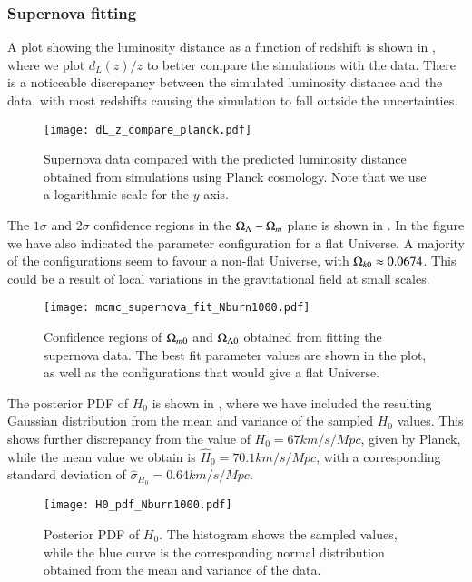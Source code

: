 \subsubsection{Supernova fitting}

A plot showing the luminosity distance as a function of redshift is shown in , where we plot $d_L(z)/z$ to better compare the simulations with the data. There is a noticeable discrepancy between the simulated luminosity distance and the data, with most redshifts causing the simulation to fall outside the uncertainties.       
\begin{figure}[ht!]
    \texttt{[image: dL\_z\_compare\_planck.pdf]}
    \caption{Supernova data compared with the predicted luminosity distance obtained from simulations using Planck cosmology. Note that we use a logarithmic scale for the $y$-axis.}
    \label{fig:M1:dL_of_z_data_vs_Planck}
\end{figure}

The $1\sigma$ and $2\sigma$ confidence regions in the $\Omega_{\Lambda}-\Omega_{m}$ plane is shown in . In the figure we have also indicated the parameter configuration for a flat Universe. A majority of the configurations seem to favour a non-flat Universe, with $\Omega_{k0}\approx 0.0674$. This could be a result of local variations in the gravitational field at small scales.      
\begin{figure}[ht!]
    \texttt{[image: mcmc\_supernova\_fit\_Nburn1000.pdf]}
    \caption{Confidence regions of $\Omega_{m0}$ and $\Omega_{\Lambda 0}$ obtained from fitting the supernova data. The best fit parameter values are shown in the plot, as well as the configurations that would give a flat Universe.}
    \label{fig:M1:oM_oL_plane}
\end{figure}

The posterior PDF of $H_0$ is shown in , where we have included the resulting Gaussian distribution from the mean and variance of the sampled $H_0$ values. This shows further discrepancy from the value of $H_0=67\unit{km/s/Mpc}$, given by Planck, while the mean value we obtain is $\hat{H}_0=70.1\unit{km/s/Mpc}$, with a corresponding standard deviation of $\hat{\sigma}_{H_0}=0.64\unit{km/s/Mpc}$.       
\begin{figure}[ht!]
    \texttt{[image: H0\_pdf\_Nburn1000.pdf]}    
    \caption{Posterior PDF of $H_0$. The histogram shows the sampled values, while the blue curve is the corresponding normal distribution obtained from the mean and variance of the data.}
    \label{fig:M1:H0_posterior_pdf}
\end{figure}



